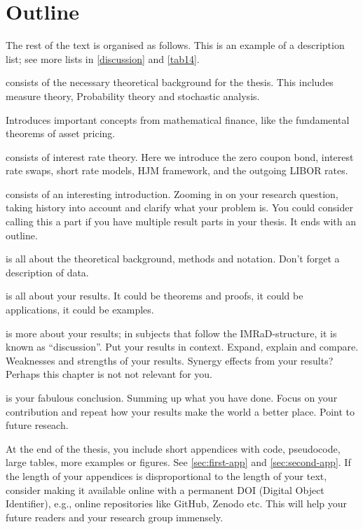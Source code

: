 \chapter{Outline}
\label{intro}

The rest of the text is organised as follows. This is an example of a description list; see more lists in \cref{discussion} and \vref{tab14}.
\begin{description}
    \item[\cref{chp_theoretical_background}] consists of the necessary theoretical background for the thesis. This includes measure theory, Probability theory and stochastic analysis. 

    \item[\cref{chp_mathematical_finance}] Introduces important concepts from mathematical finance, like the fundamental theorems of asset pricing. 

    \item[\cref{chp_interest_rate_theory}] consists of interest rate theory. Here we introduce the zero coupon bond, interest rate swaps, short rate models, HJM framework, and the outgoing LIBOR rates.

    \item[\cref{intro}] consists of an interesting introduction. Zooming in on your research question, taking history into account and clarify what your problem is. You could consider calling this a part if you have multiple result parts in your thesis. It ends with an outline.
    \item[\cref{background}] is all about the theoretical background, methods and notation. Don't forget a description of data. 
    \item[\cref{results}] is all about your results. It could be theorems and proofs, it could be applications, it could be examples.
    \item[\cref{discussion}] is more about your results; in subjects that follow the IMRaD-structure, it is known as \enquote{discussion}. Put your results in context. Expand, explain and compare. Weaknesses and strengths of your results. Synergy effects from your results?  Perhaps this chapter is not not relevant for you.
    \item[\cref{conc}] is your fabulous conclusion. Summing up what you have done. Focus on your contribution and repeat how your results make the world a better place. Point to future reseach.
    \item At the end of the thesis, you include short appendices with code, pseudocode, large tables, more examples or figures. See \cref{sec:first-app} and \cref{sec:second-app}. If the length of your appendices is disproportional to the length of your text, consider making it available online with a permanent DOI (Digital Object Identifier), e.g., online repositories like GitHub, Zenodo etc. This will help your future readers and your research group immensely.
\end{description}